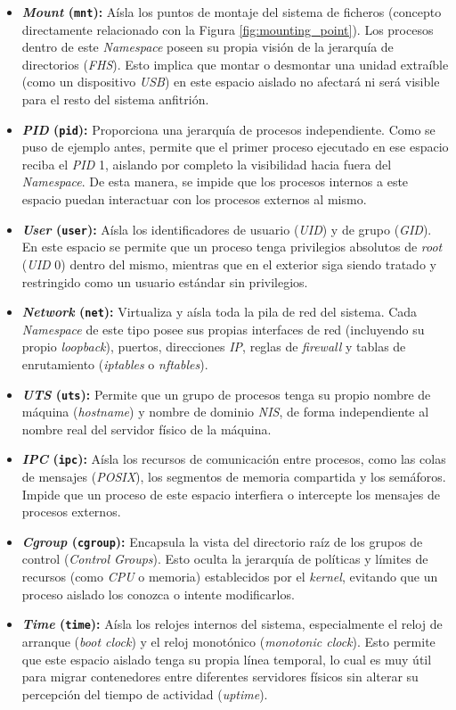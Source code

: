 \begin{itemize}
    \item \textbf{\textit{Mount} (\texttt{mnt}):} Aísla los puntos de montaje del sistema de ficheros (concepto directamente relacionado con la Figura \ref{fig:mounting_point}). Los procesos dentro de este \textit{Namespace} poseen su propia visión de la jerarquía de directorios (\textit{FHS}).
    Esto implica que montar o desmontar una unidad extraíble (como un dispositivo \textit{USB}) en este espacio aislado no afectará ni será visible para el resto del sistema anfitrión.
    \item \textbf{\textit{PID} (\texttt{pid}):} Proporciona una jerarquía de procesos independiente. Como se puso de ejemplo antes, permite que el primer proceso ejecutado en ese espacio reciba el \textit{PID} 1, 
    aislando por completo la visibilidad hacia fuera del \textit{Namespace}. De esta manera, se impide que los procesos internos a este espacio puedan interactuar con los procesos externos al mismo.
    \item \textbf{\textit{User} (\texttt{user}):} Aísla los identificadores de usuario (\textit{UID}) y de grupo (\textit{GID}).
    En este espacio se permite que un proceso tenga privilegios absolutos de \textit{root} (\textit{UID} 0) dentro del mismo, mientras que en el exterior siga siendo tratado y restringido como un usuario estándar sin privilegios.
    \item \textbf{\textit{Network} (\texttt{net}):} Virtualiza y aísla toda la pila de red del sistema. Cada \textit{Namespace} de este tipo posee sus propias interfaces de red (incluyendo su propio \textit{loopback}),
    puertos, direcciones \textit{IP}, reglas de \textit{firewall} y tablas de enrutamiento (\textit{iptables} o \textit{nftables}).
    \item \textbf{\textit{UTS} (\texttt{uts}):} Permite que un grupo de procesos tenga su propio nombre de máquina (\textit{hostname}) y nombre de dominio \textit{NIS}, de forma independiente al nombre real del servidor físico de la máquina.
    \item \textbf{\textit{IPC} (\texttt{ipc}):} Aísla los recursos de comunicación entre procesos, como las colas de mensajes (\textit{POSIX}), los segmentos de memoria compartida y los semáforos.
    Impide que un proceso de este espacio interfiera o intercepte los mensajes de procesos externos.
    \item \textbf{\textit{Cgroup} (\texttt{cgroup}):} Encapsula la vista del directorio raíz de los grupos de control (\textit{Control Groups}).
    Esto oculta la jerarquía de políticas y límites de recursos (como \textit{CPU} o memoria) establecidos por el \textit{kernel}, evitando que un proceso aislado los conozca o intente modificarlos.
    \item \textbf{\textit{Time} (\texttt{time}):} Aísla los relojes internos del sistema, especialmente el reloj de arranque (\textit{boot clock}) y el reloj monotónico (\textit{monotonic clock}).
    Esto permite que este espacio aislado tenga su propia línea temporal, lo cual es muy útil para migrar contenedores entre diferentes servidores físicos sin alterar su percepción del tiempo de actividad (\textit{uptime}).
  \end{itemize}

